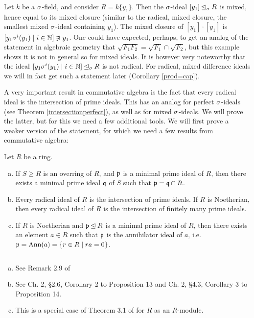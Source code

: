 \begin{ex} %
Let $k$ be a $\sigma$-field, and consider $R = k\{y_1\}$. Then the $\sigma$-ideal $[y_1] \unlhd_{\sigma} R$ is mixed, hence equal to its mixed closure (similar to the radical, mixed closure, the smallest mixed $\sigma$-ideal containing $y_1$).
The mixed closure of $[y_1] \cdot [y_1]$ is $[ y_1 \sigma^i(y_1) \mid i \in \mathbb{N} ] \not \ni y_1$.
One could have expected, perhaps, to get an analog of the statement in algebraic geometry that $\sqrt{F_1  F_2 } = \sqrt{F_1} \cap \sqrt{F_2}$, but this example shows it is not in general so for mixed ideals.
It is however very noteworthy that the ideal $[ y_1 \sigma^i(y_1) \mid i \in \mathbb{N} ] \unlhd_{\sigma} R$ is not radical. For radical, mixed difference ideals we will in fact get such a statement later (Corollary \ref{prod=cap}).
\end{ex}

A very important result in commutative algebra is the fact that every radical ideal is the intersection of prime ideals. This has an analog for perfect $\sigma$-ideals (see Theorem \ref{intersectionperfect}), as well as for mixed $\sigma$-ideals. 
We will prove the latter, but for this we need a few additional tools. We will first prove a weaker version of the statement, for which we need a few results from commutative algebra:

\begin{lem}\label{commalg}
Let $R$ be a ring. 
\begin{enumerate}[(a)]
\item If $S \geq R$ is an overring of $R$, and $\mathfrak{p}$ is a minimal prime ideal of $R$, then there exists a minimal prime ideal $\mathfrak{q}$ of $S$ such that $\mathfrak{p} = \mathfrak{q} \cap R$.
\item Every radical ideal of $R$ is the intersection of prime ideals. If $R$ is Noetherian, then every radical ideal of $R$ is the intersection of finitely many prime ideals.
\item If $R$ is Noetherian and $\mathfrak{p} \unlhd R$ is a minimal prime ideal of $R$, then there exists an element $a \in R$ such that $\mathfrak{p}$ is the annihilator ideal of $a$, i.e. $\mathfrak{p} = \text{Ann}(a) = \{ r \in R \mid ra = 0 \}$.
\end{enumerate}
\begin{bew} $~$
\begin{enumerate}[(a)]
\item See Remark 2.9 of \cite{hrushovski}
\item See \cite{bourbaki} Ch. 2, \S 2.6, Corollary 2 to Proposition 13 and Ch. 2, \S 4.3, Corollary 3 to Proposition 14.
\item This is a special case of Theorem 3.1 of \cite{eisenbud} for $R$ as an $R$-module.
\end{enumerate}
\end{bew}
\end{lem}


